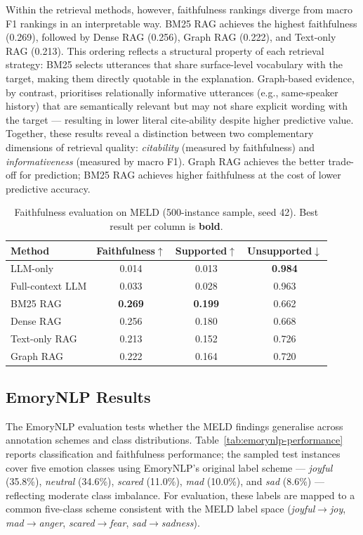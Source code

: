 \documentclass[runningheads]{llncs}
\begin{document}
Within the retrieval methods, however, faithfulness rankings diverge
from macro F1 rankings in an interpretable way. BM25 RAG achieves the
highest faithfulness (0.269), followed by Dense RAG (0.256), Graph RAG
(0.222), and Text-only RAG (0.213). This ordering reflects a structural
property of each retrieval strategy: BM25 selects utterances that share
surface-level vocabulary with the target, making them directly quotable
in the explanation. Graph-based evidence, by contrast, prioritises
relationally informative utterances (e.g., same-speaker history) that
are semantically relevant but may not share explicit wording with the
target — resulting in lower literal cite-ability despite higher predictive
value. Together, these results reveal a distinction between two complementary
dimensions of retrieval quality: \emph{citability} (measured by faithfulness)
and \emph{informativeness} (measured by macro F1). Graph RAG achieves the
better trade-off for prediction; BM25 RAG achieves higher faithfulness at
the cost of lower predictive accuracy.

\begin{table}
\centering
\caption{Faithfulness evaluation on MELD (500-instance sample, seed 42).
Best result per column is \textbf{bold}.}
\label{tab:faithfulness}
\begin{tabular}{lccc}
\toprule
Method & Faithfulness$\uparrow$ & Supported$\uparrow$ & Unsupported$\downarrow$ \\
\midrule
LLM-only          & 0.014          & 0.013          & \textbf{0.984} \\
Full-context LLM  & 0.033          & 0.028          & 0.963 \\
BM25 RAG          & \textbf{0.269} & \textbf{0.199} & 0.662 \\
Dense RAG         & 0.256          & 0.180          & 0.668 \\
Text-only RAG     & 0.213          & 0.152          & 0.726 \\
Graph RAG         & 0.222          & 0.164          & 0.720 \\
\bottomrule
\end{tabular}
\end{table}

\subsection{EmoryNLP Results}
\label{sec:emorynlp-results}

The EmoryNLP evaluation tests whether the MELD findings generalise across
annotation schemes and class distributions. Table~\ref{tab:emorynlp-performance}
reports classification and faithfulness performance; the sampled test instances
cover five emotion classes using EmoryNLP's original label scheme —
\textit{joyful} (35.8\%), \textit{neutral} (34.6\%), \textit{scared}
(11.0\%), \textit{mad} (10.0\%), and \textit{sad} (8.6\%) — reflecting
moderate class imbalance. For evaluation, these labels are mapped to a
common five-class scheme consistent with the MELD label space
(\textit{joyful}$\to$\textit{joy}, \textit{mad}$\to$\textit{anger},
\textit{scared}$\to$\textit{fear}, \textit{sad}$\to$\textit{sadness}).
\end{document}
